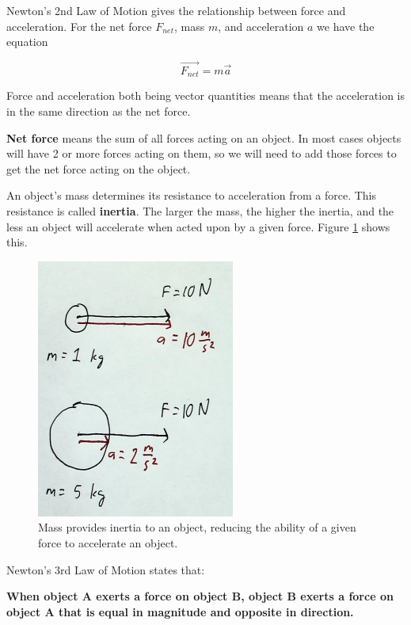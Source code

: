 \documentclass[12pt]{book}
\begin{document}
\linespace

Newton's 2nd Law of Motion gives the relationship between force and acceleration. For the net force $F_{net}$, mass $m$, and acceleration $a$ we have the equation

\begin{equation}
\overrightarrow{F_{net}} = m \overrightarrow{a}
\label{2ndlaw}
\end{equation} 


Force and acceleration both being vector quantities means that the acceleration is in the same direction as the net force.

\textbf{Net force} means the sum of all forces acting on an object. In most cases objects will have 2 or more forces acting on them, so we will need to add those forces to get the net force acting on the object.

An object's mass determines its resistance to acceleration from a force. This resistance is called \textbf{inertia}. The larger the mass, the higher the inertia, and the less an object will accelerate when acted upon by a given force. Figure \ref{inertia} shows this.

\begin{figure}[H]
\centering
\includegraphics[scale=0.8]{Inertia_Mass.png}
\caption{Mass provides inertia to an object, reducing the ability of a given force to accelerate an object.}
\label{inertia}
\end{figure}

\linespace

Newton's 3rd Law of Motion states that:

\hspace{10pt}

\textbf{When object A exerts a force on object B, object B exerts a force on object A that is equal in magnitude and opposite in direction.}
\end{document}
